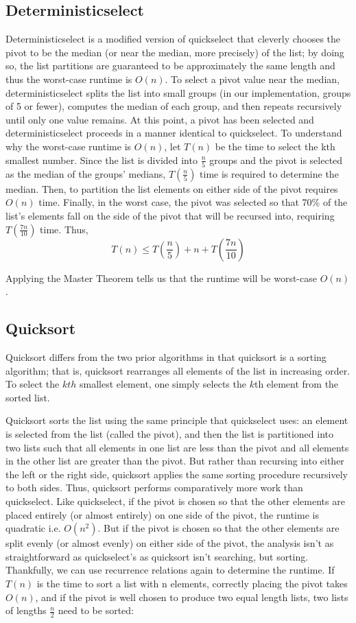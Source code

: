 \documentclass{article}
\begin{document}
\subsection*{Deterministicselect}
\indent \indent Deterministicselect is a modified version of quickselect that cleverly chooses the pivot to be the median (or near the median, more precisely) of the list; by doing so, the list partitions are guaranteed to be approximately the same length and thus the worst-case runtime is $O(n)$. To select a pivot value near the median, deterministicselect splits the list into small groups (in our implementation, groups of 5 or fewer), computes the median of each group, and then repeats recursively until only one value remains. At this point, a pivot has been selected and deterministicselect proceeds in a manner identical to quickselect. To understand why the worst-case runtime is $O(n)$, let $T(n)$ be the time to select the kth smallest number. Since the list is divided into $\frac{n}{5}$ groups and the pivot is selected as the median of the groups' medians, $T(\frac{n}{5})$ time is required to determine the median. Then, to partition the list elements on either side of the pivot requires $O(n)$ time. Finally, in the worst case, the pivot was selected so that 70\% of the list's elements fall on the side of the pivot that will be recursed into, requiring $T(\frac{7n}{10})$ time. Thus, $$T(n) \leq T(\frac{n}{5}) + n + T(\frac{7n}{10})$$

Applying the Master Theorem tells us that the runtime will be worst-case $O(n)$.

\subsection*{Quicksort}
\indent \indent Quicksort differs from the two prior algorithms in that quicksort is a sorting algorithm; that is, quicksort rearranges all elements of the list in increasing order. To select the $kth$ smallest element, one simply selects the $k$th element from the sorted list.

Quicksort sorts the list using the same principle that quickselect uses: an element is selected from the list (called the pivot), and then the list is partitioned into two lists such that all elements in one list are less than the pivot and all elements in the other list are greater than the pivot. But rather than recursing into either the left or the right side, quicksort applies the same sorting procedure recursively to both sides. Thus, quicksort performs comparatively more work than quickselect. Like quickselect, if the pivot is chosen so that the other elements are placed entirely (or almost entirely) on one side of the pivot, the runtime is quadratic i.e. $O(n^2)$. But if the pivot is chosen so that the other elements are split evenly (or almost evenly) on either side of the pivot, the analysis isn't as straightforward as quickselect's as quicksort isn't searching, but sorting. Thankfully, we can use recurrence relations again to determine the runtime. If $T(n)$ is the time to sort a list with n elements, correctly placing the pivot takes $O(n)$, and if the pivot is well chosen to produce two equal length lists, two lists of lengths $\frac{n}{2}$ need to be sorted:
\end{document}
